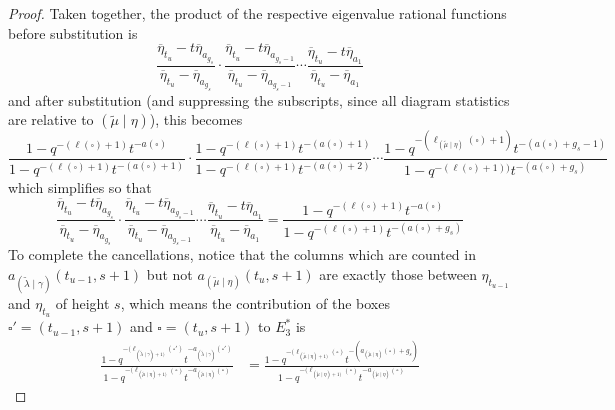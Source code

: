\documentclass[ALCO]{cedram}
\newcommand{\mutilde}{{\widetilde{\mu}}}
\newcommand{\lambdatilde}{{\widetilde{\lambda}}}
\newcommand{\lambdatildegamma}{{(\lambdatilde \mid \gamma)}}
\newcommand{\mutildeeta}{{(\mutilde \mid \eta)}}
\newcommand{\leg}[1]{{\ell_{#1}(\square)}}
\newcommand{\Estarthree}{E^*_3}
\begin{document}
\begin{proof}
Taken together, the product of the respective eigenvalue rational functions before substitution is
\[ \frac{\overline{\eta}_{t_u} - t \overline{\eta}_{a_{g_s}}}{\overline{\eta}_{t_u} -  \overline{\eta}_{a_{g_s}}}\cdot \frac{\overline{\eta}_{t_u} - t \overline{\eta}_{a_{g_s-1}}}{\overline{\eta}_{t_u} -  \overline{\eta}_{a_{g_s-1}}} \dotsm \frac{\overline{\eta}_{t_u} - t \overline{\eta}_{a_{1}}}{\overline{\eta}_{t_u} -  \overline{\eta}_{a_{1}}}\]
and after substitution (and suppressing the subscripts, since all diagram statistics are relative to $\mutildeeta$), this becomes
\[ \frac{1-q^{-(\ell(\square)+1)}t^{-a(\square)}}{1-q^{-(\ell(\square)+1)}t^{-(a(\square)+1)}} \cdot \frac{1-q^{-(\ell(\square)+1)}t^{-(a(\square)+1)}}{1-q^{-(\ell(\square)+1)}t^{-(a(\square)+2)}} \dotsm \frac{1-q^{-(\leg{\mutildeeta}+1)}t^{-(a(\square)+g_s-1)}}{1-q^{-(\ell(\square)+1))}t^{-(a(\square)+g_s)}}\]
which simplifies so that
\[  \frac{\overline{\eta}_{t_u} - t \overline{\eta}_{a_{g_s}}}{\overline{\eta}_{t_u} -  \overline{\eta}_{a_{g_s}}}\cdot \frac{\overline{\eta}_{t_u} - t \overline{\eta}_{a_{g_s-1}}}{\overline{\eta}_{t_u} -  \overline{\eta}_{a_{g_s-1}}} \dotsm \frac{\overline{\eta}_{t_u} - t \overline{\eta}_{a_{1}}}{\overline{\eta}_{t_u} -  \overline{\eta}_{a_{1}}} = \frac{1-q^{-(\ell(\square)+1)}t^{-a(\square)}}{1-q^{-(\ell(\square)+1)}t^{-(a(\square)+g_s)}}\]
To complete the cancellations, notice that the columns which are counted in $a_\lambdatildegamma(t_{u-1},s+1)$ but not $a_\mutildeeta(t_u,s+1)$ are exactly those between $\eta_{t_{u-1}}$ and $\eta_{t_u}$ of height $s$, which means the contribution of the boxes $\square' =(t_{u-1},s+1)$ and $\square =(t_{u},s+1)$ to $\Estarthree$ is
\begin{align*}
    \frac{1-q^{-(\ell_{\lambdatildegamma+1)}(\square')}t^{-a_\lambdatildegamma(\square')}}{1-q^{-(\ell_{\mutildeeta+1)}(\square)}t^{-a_\mutildeeta(\square)}} &= \frac{1-q^{-(\ell_{\mutildeeta+1)}(\square)}t^{-(a_\mutildeeta(\square)+g_s)}}{1-q^{-(\ell_{\mutildeeta+1)}(\square)}t^{-a_\mutildeeta(\square)}}
\end{align*}


\end{proof}
\end{document}
